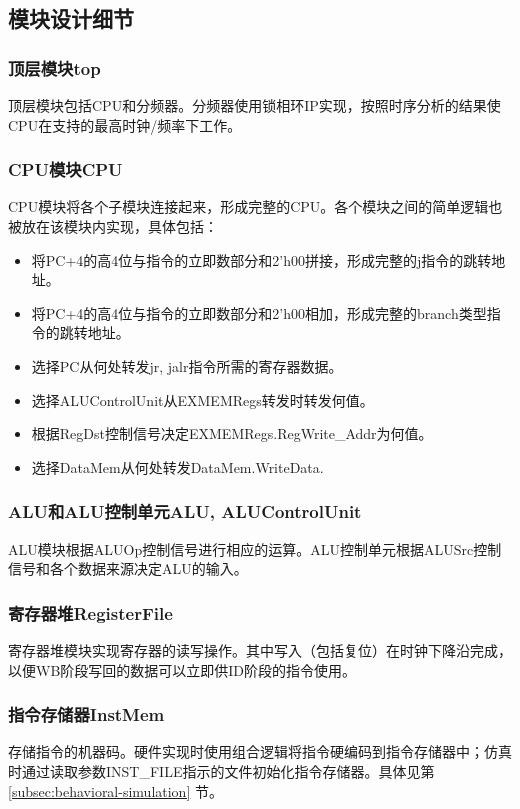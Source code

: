 \subsection{模块设计细节}

\subsubsection{顶层模块top}
顶层模块包括CPU和分频器。分频器使用锁相环IP实现，按照时序分析的结果使CPU在支持的最高时钟/频率下工作。

\subsubsection{CPU模块CPU}
CPU模块将各个子模块连接起来，形成完整的CPU。各个模块之间的简单逻辑也被放在该模块内实现，具体包括：
\begin{itemize}
    \item 将PC+4的高4位与指令的立即数部分和2'h00拼接，形成完整的j指令的跳转地址。
    \item 将PC+4的高4位与指令的立即数部分和2'h00相加，形成完整的branch类型指令的跳转地址。
    \item 选择PC从何处转发jr, jalr指令所需的寄存器数据。
    \item 选择ALUControlUnit从EXMEMRegs转发时转发何值。
    \item 根据RegDst控制信号决定EXMEMRegs.RegWrite\_Addr为何值。
    \item 选择DataMem从何处转发DataMem.WriteData.
\end{itemize}

\subsubsection{ALU和ALU控制单元ALU, ALUControlUnit}
ALU模块根据ALUOp控制信号进行相应的运算。ALU控制单元根据ALUSrc控制信号和各个数据来源决定ALU的输入。

\subsubsection{寄存器堆RegisterFile}
寄存器堆模块实现寄存器的读写操作。其中写入（包括复位）在时钟下降沿完成，以便WB阶段写回的数据可以立即供ID阶段的指令使用。

\subsubsection{指令存储器InstMem}
存储指令的机器码。硬件实现时使用组合逻辑将指令硬编码到指令存储器中；仿真时通过读取参数INST\_FILE指示的文件初始化指令存储器。具体见第 \ref{subsec:behavioral-simulation} 节。


